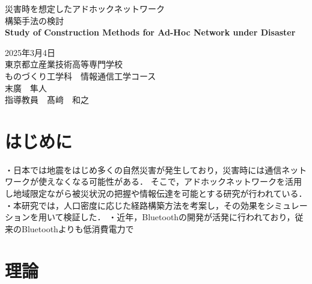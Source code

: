 \documentclass[a4paper, 11pt]{ltjsarticle}
\begin{document}
\fontsize{11pt}{14pt}\selectfont

\thispagestyle{empty}
\begin{center}

\vspace*{40mm}
{\huge\noindent 災害時を想定したアドホックネットワーク}\\
\medskip
{\huge\noindent 構築手法の検討}\\
\vspace{\baselineskip}
{\huge\noindent\textbf{Study of Construction Methods for Ad-Hoc Network under Disaster}}\\
\vspace{120mm}

{\huge\noindent
2025年3月4日\\
東京都立産業技術高等専門学校\\
ものづくり工学科　情報通信工学コース \\
末廣　隼人\\
指導教員　髙﨑　和之    \\
}
\vspace{40mm}

\end{center}

\clearpage  %
\thispagestyle{empty}
\tableofcontents  %

\clearpage
{}
\section{はじめに}
・日本では地震をはじめ多くの自然災害が発生しており，災害時には通信ネットワークが使えなくなる可能性がある．
そこで，アドホックネットワークを活用し地域限定ながら被災状況の把握や情報伝達を可能とする研究が行われている．
・本研究では，人口密度に応じた経路構築方法を考案し，その効果をシミュレーションを用いて検証した．
・近年，Bluetoothの開発が活発に行われており，従来のBluetoothよりも低消費電力で


\clearpage
\section{理論}
\end{document}

